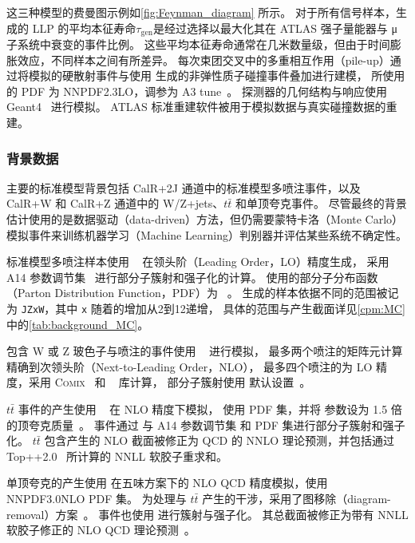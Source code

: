 这三种模型的费曼图示例如\autoref{fig:Feynman_diagram} 所示。
对于所有信号样本，生成的 LLP 的平均本征寿命$\tau_{\text{gen}}$是经过选择以最大化其在 ATLAS 强子量能器与 μ 子系统中衰变的事件比例。
这些平均本征寿命通常在几米数量级，但由于时间膨胀效应，不同样本之间有所差异。
每次束团交叉中的多重相互作用（pile-up）通过将模拟的硬散射事件与使用  生成的非弹性质子碰撞事件叠加进行建模，
所使用的 PDF 为 NNPDF2.3LO，调参为 A3 tune~\cite{ATL-PHYS-PUB-2016-017}。
探测器的几何结构与响应使用 Geant4~\cite{GEANT4:2002zbu} 进行模拟。
ATLAS 标准重建软件被用于模拟数据与真实碰撞数据的重建。

\subsubsection{背景数据}
主要的标准模型背景包括 CalR+2J 通道中的标准模型多喷注事件，以及 CalR+W 和 CalR+Z 通道中的 W/Z+jets、$t\bar{t}$ 和单顶夸克事件。
尽管最终的背景估计使用的是数据驱动（data-driven）方法，但仍需要蒙特卡洛（Monte Carlo）模拟事件来训练机器学习（Machine Learning）判别器并评估某些系统不确定性。

标准模型多喷注样本使用 ~\cite{pythia} 在领头阶（Leading Order，LO）精度生成，
采用 A14 参数调节集~\cite{Pythia_tunes} 进行部分子簇射和强子化的计算。
使用的部分子分布函数（Parton Distribution Function，PDF）为 \NNPDF[2.3lo]~\cite{parton_PDF}。
生成的样本依据不同的\pt 范围被记为 \texttt{JZxW}，其中 \texttt{x} 随着\pt 的增加从2到12递增，
具体的\pt 范围与产生截面详见\autoref{cpm:MC} 中的\autoref{tab:background_MC}。

包含 W 或 Z 玻色子与喷注的事件使用 \Sherpa[v2.2.1]~\cite{Sherpa} 进行模拟，
最多两个喷注的矩阵元计算精确到次领头阶（Next-to-Leading Order，NLO），
最多四个喷注的为 LO 精度，采用 \textsc{Comix}~\cite{Comix} 和 \OPENLOOPS~\cite{Open_Loops} 库计算，
部分子簇射使用 \Sherpa 默认设置~\cite{parton_shower}。

$t\bar{t}$ 事件的产生使用 \POWHEGBOX[v2]~\cite{POWHEG_BOX} 在 NLO 精度下模拟，
使用 \NNPDF[3.0NLO] PDF 集，并将 \hdamp 参数设为 1.5 倍的顶夸克质量~\cite{ATL-PHYS-PUB-2016-020}。
事件通过 \Pythia[8.230] 与 A14 参数调节集 和 \NNPDF[2.3LO] PDF 集进行部分子簇射和强子化。
$t\bar{t}$ 包含产生的 NLO 截面被修正为 QCD 的 NNLO 理论预测，并包括通过 Top++2.0~\cite{Beneke:2011mq} 所计算的 NNLL 软胶子重求和。

单顶夸克的产生使用 \POWHEGBOX[v2] 在五味方案下的 NLO QCD 精度模拟，使用 NNPDF3.0NLO PDF 集。
为处理与 $t\bar{t}$ 产生的干涉，采用了图移除（diagram-removal）方案~\cite{Frixione:2008yi}。
事件也使用  进行簇射与强子化。
其总截面被修正为带有 NNLL 软胶子修正的 NLO QCD 理论预测~\cite{Aliev:2010zk}。


